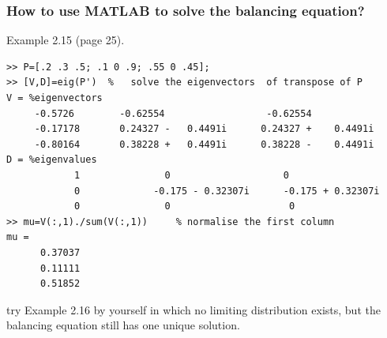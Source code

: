 \documentclass[english,10pt]{beamer}
\begin{document}
\begin{frame}[fragile]
\frametitle{How to use MATLAB to solve the balancing equation?}
  Example 2.15 (page 25).
\begin{lstlisting}
>> P=[.2 .3 .5; .1 0 .9; .55 0 .45];
>> [V,D]=eig(P')  %   solve the eigenvectors  of transpose of P
V = %eigenvectors 
     -0.5726        -0.62554              	  -0.62554     
     -0.17178       0.24327 -   0.4491i      0.24327 +    0.4491i 
     -0.80164       0.38228 +   0.4491i      0.38228 -    0.4491i
D = %eigenvalues 
            1               0                    0
            0             -0.175 - 0.32307i   	 -0.175 + 0.32307i
            0               0                     0 
>> mu=V(:,1)./sum(V(:,1))     % normalise the first column 
mu =
      0.37037
      0.11111
      0.51852
\end{lstlisting}
\pause try Example 2.16 by yourself in which no limiting distribution exists, but the balancing equation still has one unique solution.
\end{frame}

\end{document}
